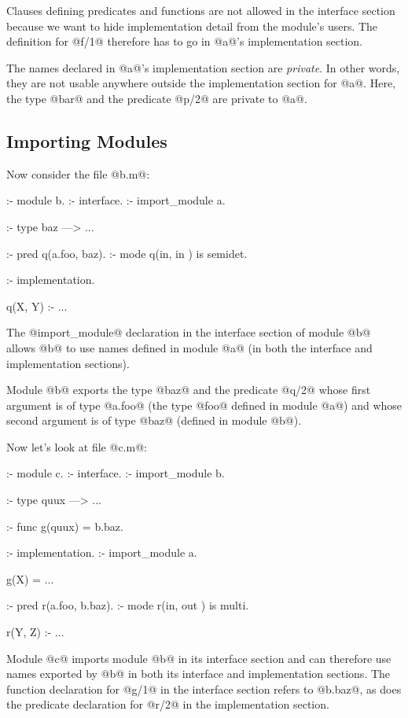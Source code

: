 Clauses defining predicates and functions are not allowed in the
interface section because we want to hide implementation detail from the
module's users.  The definition for @f/1@ therefore has to go in
@a@'s implementation section.

The names declared in @a@'s implementation section are \emph{private}.
In other words, they are not usable anywhere outside the implementation
section for @a@.  Here, the type @bar@ and the predicate @p/2@ are
private to @a@.

\subsection{Importing Modules}

Now consider the file @b.m@:
\begin{myverbatim}
:- module b.
:- interface.
:- import_module a.

:- type baz ---> ...

:- pred q(a.foo, baz).
:- mode q(in,    in ) is semidet.

:- implementation.

q(X, Y) :- ...
\end{myverbatim}
The @import_module@ declaration in the interface section of module @b@
allows @b@ to use names defined in module @a@ (in both the interface and
implementation sections).

Module @b@ exports the type @baz@ and the predicate @q/2@ whose first
argument is of type @a.foo@ (\ie the type @foo@ defined in module @a@)
and whose second argument is of type @baz@ (defined in module @b@).

Now let's look at file @c.m@:
\begin{myverbatim}
:- module c.
:- interface.
:- import_module b.

:- type quux ---> ...

:- func g(quux) = b.baz.

:- implementation.
:- import_module a.

g(X) = ...

:- pred r(a.foo, b.baz).
:- mode r(in,    out  ) is multi.

r(Y, Z) :- ...
\end{myverbatim}
Module @c@ imports module @b@ in its interface section and can therefore
use names exported by @b@ in both its interface and implementation
sections.  The function declaration for @g/1@ in the interface section
refers to @b.baz@, as does the predicate declaration for @r/2@ in the
implementation section.

